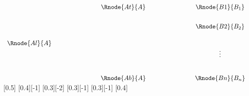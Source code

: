 $
\begin{array}{c p{2.0cm} c p{2.0cm} c}				
                           &&	\Rnode{At}{A}  &&          \Rnode{B1}{B_1}  \\ [0.65cm]
													 &&                &&          \Rnode{B2}{B_2}  \\ [0.5cm]
		\Rnode{Al}{A}          &&                &&                           \\ [0cm]
				                   &&                &&           \vdots      \\ [0.85cm]
                           &&	\Rnode{Ab}{A}  &&          \Rnode{Bn}{B_n}  
\end{array}
$
[0.5]
[0.4][-1]
[0.3][-2]
[0.3][-1]
[0.3][-1]
[0.4]
